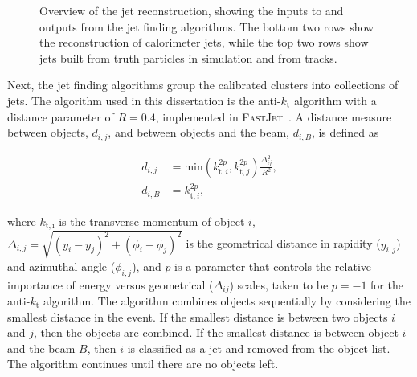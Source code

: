 \begin{figure}[htbp]
	\centering
	\caption{Overview of the jet reconstruction, showing the inputs to and outputs from the jet finding algorithms. The bottom two rows show the reconstruction of calorimeter jets, while the top two rows show jets built from truth particles in simulation and from tracks.}
	\label{fig:reco-jet-reconstruction-flowchart}
\end{figure}


Next, the jet finding algorithms group the calibrated clusters into collections of jets. The algorithm used in this dissertation is the anti-$k_{\mathrm{t}}$ algorithm with a distance parameter of $R=0.4$, implemented in \textsc{FastJet}~\cite{Cacciari:2008gp,Cacciari:2011ma}. A distance measure between objects, $d_{i,j}$, and between objects and the beam, $d_{i,B}$, is defined as

\begin{align}
	d_{i,j} &= \mathrm{min}(k_{\mathrm{t}, i}^{2p}, k_{\mathrm{t}, j}^{2p}) \frac{\Delta_{ij}^2}{R^2}, \\
	d_{i,B} &= k_{\mathrm{t},i}^{2p},
\end{align}

where $k_{\mathrm{t,i}}$ is the transverse momentum of object $i$, $\Delta_{i,j}=\sqrt{(y_i-y_j)^2+(\phi_i-\phi_j)^2}$ is the geometrical distance in rapidity ($y_{i,j}$) and azimuthal angle ($\phi_{i,j}$), and $p$ is a parameter that controls the relative importance of energy versus geometrical ($\Delta_{ij}$) scales, taken to be $p=-1$ for the anti-$k_{\mathrm{t}}$ algorithm. The algorithm combines objects sequentially by considering the smallest distance in the event. If the smallest distance is between two objects $i$ and $j$, then the objects are combined. If the smallest distance is between object $i$ and the beam $B$, then $i$ is classified as a jet and removed from the object list. The algorithm continues until there are no objects left. 

